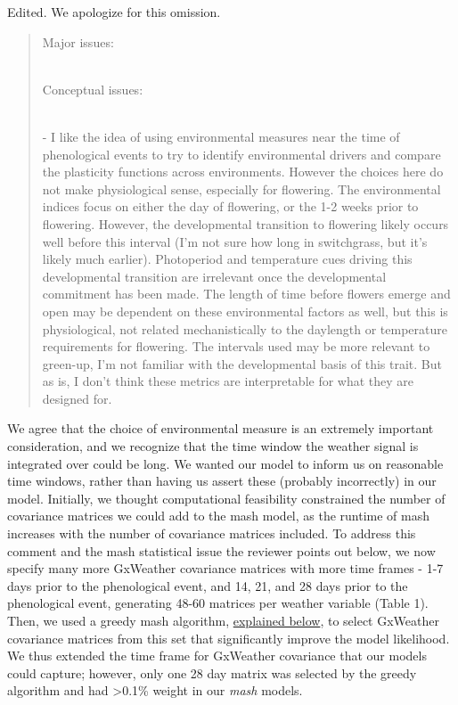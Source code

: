 \documentclass[
  letterpaper,
  DIV=11,
  numbers=noendperiod]{scrartcl}
\begin{document}
Edited. We apologize for this omission.

\begin{quote}
\begin{tcolorbox}[enhanced jigsaw, rightrule=.15mm, colframe=quarto-callout-warning-color-frame, leftrule=.75mm, arc=.35mm, colback=white, opacityback=0, left=2mm, breakable, toprule=.15mm, bottomrule=.15mm]

Major issues:\\
\strut \\
Conceptual issues:\\
\strut \\
- I like the idea of using environmental measures near the time of
phenological events to try to identify environmental drivers and compare
the plasticity functions across environments. However the choices here
do not make physiological sense, especially for flowering. The
environmental indices focus on either the day of flowering, or the 1-2
weeks prior to flowering. However, the developmental transition to
flowering likely occurs well before this interval (I'm not sure how long
in switchgrass, but it's likely much earlier). Photoperiod and
temperature cues driving this developmental transition are irrelevant
once the developmental commitment has been made. The length of time
before flowers emerge and open may be dependent on these environmental
factors as well, but this is physiological, not related mechanistically
to the daylength or temperature requirements for flowering. The
intervals used may be more relevant to green-up, I'm not familiar with
the developmental basis of this trait. But as is, I don't think these
metrics are interpretable for what they are designed for.

\end{tcolorbox}
\end{quote}

We agree that the choice of environmental measure is an extremely
important consideration, and we recognize that the time window the
weather signal is integrated over could be long. We wanted our model to
inform us on reasonable time windows, rather than having us assert these
(probably incorrectly) in our model. Initially, we thought computational
feasibility constrained the number of covariance matrices we could add
to the mash model, as the runtime of mash increases with the number of
covariance matrices included. To address this comment and the mash
statistical issue the reviewer points out below, we now specify many
more GxWeather covariance matrices with more time frames - 1-7 days
prior to the phenological event, and 14, 21, and 28 days prior to the
phenological event, generating 48-60 matrices per weather variable
(Table 1). Then, we used a greedy mash algorithm,
\hyperref[fig-greedy]{explained below}, to select GxWeather covariance
matrices from this set that significantly improve the model likelihood.
We thus extended the time frame for GxWeather covariance that our models
could capture; however, only one 28 day matrix was selected by the
greedy algorithm and had \textgreater0.1\% weight in our \emph{mash}
models.
\end{document}
